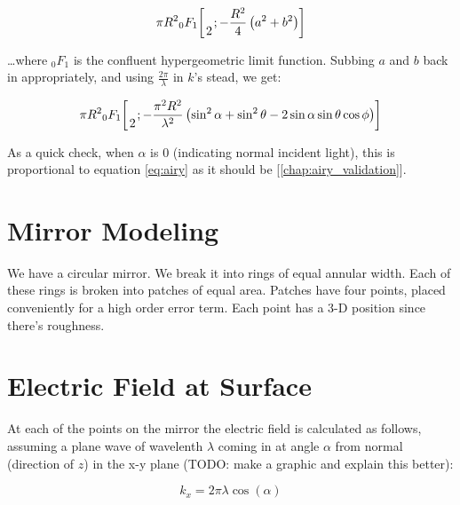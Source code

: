 \documentclass[etd,oneside,senior]{BYUPhys}
\newcommand*\pFqskip{8mu}
\newcommand*\pFq{\begingroup
        \catcode`\,\active
        \def ,{\mskip\pFqskip\relax}%
        \dopFq
}
\def\dopFq#1#2#3#4#5{%
        {}_{#1}F_{#2}\biggl[\genfrac..{0pt}{}{#3}{#4};#5\biggr]%
        \endgroup
}
\begin{document}
\begin{equation}\label{eq:expected_refl}
  \pi R^2 \pFq{0}{1}{}{2}{-\frac{R^2}{4}\left(a^2+b^2\right)}
\end{equation}

\ldots where ${}_0 F_1$ is the confluent hypergeometric limit function. Subbing $a$ and $b$ back in appropriately, and using $\frac{2\pi}{\lambda}$ in $k$'s stead, we get:

\begin{equation}
  \pi R^2 \pFq{0}{1}{}{2}{-\frac{\pi^2 R^2}{\lambda^2}\left(\sin^2\alpha+\sin^2\theta-2\sin\alpha\sin\theta\cos\phi\right)}
\end{equation}

As a quick check, when $\alpha$ is 0 (indicating normal incident light), this is proportional to equation \ref{eq:airy} as it should be [\ref{chap:airy_validation}].







\section{Mirror Modeling}

We have a circular mirror. We break it into rings of equal annular width. Each of these rings is broken into patches of equal area. Patches have four points, placed conveniently for a high order error term. Each point has a 3-D position since there's roughness.



\section{Electric Field at Surface}\label{chap:efield}

At each of the points on the mirror the electric field is calculated as follows, assuming a plane wave of wavelenth $\lambda$ coming in at angle $\alpha$ from normal (direction of $z$) in the x-y plane (TODO: make a graphic and explain this better):

\begin{equation}
  k_{x}=2\pi\lambda\cos\left(\alpha\right)
\end{equation}
\end{document}
